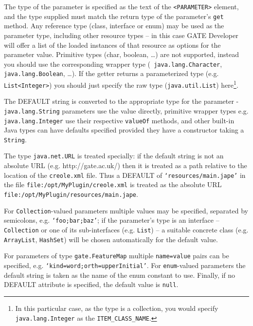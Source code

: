 The type of the parameter is specified as the text of
the \verb|<PARAMETER>| element, and the type supplied must match the
return type of the parameter's {\tt get} method.  Any reference type
(class, interface or enum) may be used as the parameter type,
including other resource types -- in this case GATE Developer will
offer a list of the loaded instances of that resource as options for
the parameter value.  Primitive types (char, boolean, \ldots) are not
supported, instead you should use the corresponding wrapper type ({\tt
java.lang.Character}, {\tt java.lang.Boolean}, \ldots).  If the getter
returns a parameterized type (e.g. \verb|List<Integer>|) you should
just specify the raw type ({\tt java.util.List}) here\footnote{In this
particular case, as the type is a collection, you would specify {\tt
java.lang.Integer} as the {\tt ITEM\_CLASS\_NAME}.}.

The DEFAULT string is converted to the appropriate type for the parameter -
\texttt{java.lang.String} parameters use the value directly, primitive wrapper
types e.g. \texttt{java.lang.Integer} use their respective \texttt{valueOf}
methods, and other built-in Java types can have defaults specified provided
they have a constructor taking a \texttt{String}.

The type \texttt{java.net.URL} is treated specially: if the default
string is not an absolute URL (e.g. http://gate.ac.uk/) then it is treated as a
path relative to the location of the \texttt{creole.xml} file.  Thus a DEFAULT
of \texttt{`resources/main.jape'} in the file
\texttt{file:/opt/MyPlugin/creole.xml} is treated as the absolute URL
\texttt{file:/opt/MyPlugin/resources/main.jape}.

For \texttt{Collection}-valued parameters multiple values may be specified,
separated by semicolons, e.g. \texttt{`foo;bar;baz'}; if the parameter's type
is an interface -- \texttt{Collection} or one of its sub-interfaces (e.g.
\texttt{List}) -- a suitable concrete class (e.g. \texttt{ArrayList},
\texttt{HashSet}) will be chosen automatically for the default value.

For parameters of type \texttt{gate.FeatureMap} multiple \texttt{name=value}
pairs can be specified, e.g.  \texttt{`kind=word;orth=upperInitial'}.  For
\texttt{enum}-valued parameters the default string is taken as the name of the
enum constant to use.  Finally, if no DEFAULT attribute is specified, the
default value is \texttt{null}.


